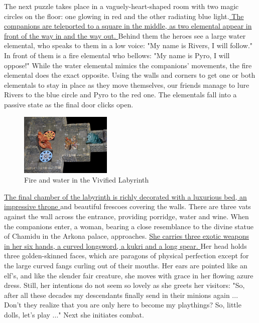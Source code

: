 The next puzzle takes place in a vaguely-heart-shaped room with two magic circles on the floor: one glowing in red and the other radiating blue light.\hyperref[fig:Fire-and-water-in-the-Vivified-Labyrinth-565300388]{ The companions are teleported to a square in the middle, as two elemental appear in front of the way in and the way out. } Behind them the heroes see a large water elemental, who speaks to them in a low voice: "My name is Rivers, I will follow." In front of them is a fire elemental who bellows: "My name is Pyro, I will oppose!" While the water elemental mimics the companions' movements, the fire elemental does the exact opposite. Using the walls and corners to get one or both elementals to stay in place as they move themselves, our friends manage to lure Rivers to the blue circle and Pyro to the red one. The elementals fall into a passive state as the final door clicks open. \\

\begin{figure}[h]
	\centering
	\includegraphics[width=0.39\textwidth]{images/Fire-and-water-in-the-Vivified-Labyrinth-565300388.jpg}
	\caption{Fire and water in the Vivified Labyrinth}
	\label{fig:Fire-and-water-in-the-Vivified-Labyrinth-565300388}
\end{figure}

\hyperref[fig:Vivified-labyrinth25-565301156]{ The final chamber of the labyrinth is richly decorated with a luxurious bed, an impressive throne } and beautiful frescoes covering the walls. There are three vats against the wall across the entrance, providing porridge, water and wine. When the companions enter, a woman, bearing a close resemblance to the divine statue of Chamidu in the Arkona palace, approaches. \hyperref[fig:Nerio-Arkona-s-treasure-565301563]{ She carries three exotic weapons in her six hands, a curved longsword, a kukri and a long spear. } Her head holds three golden-skinned faces, which are paragons of physical perfection except for the large curved fangs curling out of their mouths. Her ears are pointed like an elf's, and like the slender fair creature, she moves with grace in her flowing azure dress. Still, her intentions do not seem so lovely as she greets her visitors: "So, after all these decades my descendants finally send in their minions again ... Don't they realize that you are only here to become my playthings? So, little dolls, let's play ..." Next she initiates combat. \\

